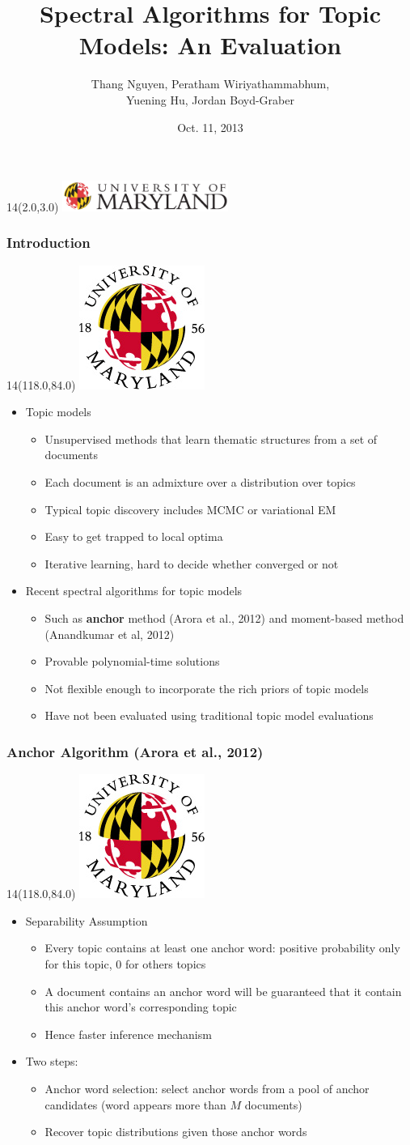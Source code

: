 \documentclass{beamer}
\title[Spectral Algorithms for Topic Models]{Spectral Algorithms for Topic Models: An Evaluation}
\author[Thang Nguyen et al.] {Thang Nguyen, Peratham Wiriyathammabhum, \\ Yuening Hu, Jordan Boyd-Graber}
\institute[UMD]{

   {daithang,peratham,ynhu,jbg}@umiacs.umd.edu\\
   University of Maryland, College Park
}
\date{Oct. 11, 2013}
\let\oldframetitle\frametitle
\renewcommand{\frametitle}[1]{
\oldframetitle{#1}
\BottomLogo
}
\let\oldtitlepage\titlepage
\renewcommand{\titlepage}{
\oldtitlepage
\TitleLogo
}
\newcommand{\BottomLogo}{
\begin{textblock}{14}(118.0,84.0)
\includegraphics[height=.8cm]{figures/umd-logo1.jpg}
\end{textblock}
}
\newcommand{\TitleLogo}{
\begin{textblock}{14}(2.0,3.0)
\includegraphics[height=1.0cm]{figures/umd-logo2.jpg}
\end{textblock}
}
\begin{document}
\begin{frame}
  \titlepage
\end{frame}

\begin{frame}
\frametitle{Introduction}

\begin{itemize}
\item Topic models
\begin{itemize}
\item Unsupervised methods that learn thematic structures from a set of documents
\item Each document is an admixture over a distribution over topics
\item Typical topic discovery includes MCMC or variational EM
\item Easy to get trapped to local optima
\item Iterative learning, hard to decide whether converged or not
\end{itemize}

\item Recent spectral algorithms for topic models
\begin{itemize}
\item Such as {\bf anchor} method (Arora et al., 2012) and moment-based method (Anandkumar et al, 2012)
\item Provable polynomial-time solutions
\item Not flexible enough to incorporate the rich priors of topic models
\item Have not been evaluated using traditional topic model evaluations
\end{itemize}
\end{itemize}
\end{frame}


\begin{frame}
\frametitle{Anchor Algorithm (Arora et al., 2012)}
\begin{itemize}
\item Separability Assumption
\begin{itemize}
\item Every topic contains at least one anchor word: positive probability only for this topic, 0 for others topics
\item A document contains an anchor word will be guaranteed that it contain this anchor word's corresponding topic
\item Hence faster inference mechanism
\end{itemize}
\item Two steps:
\begin{itemize}
\item Anchor word selection: select anchor words from a pool of anchor candidates (word appears more than $M$ documents)
\item Recover topic distributions given those anchor words
\end{itemize}
\end{itemize} 
\end{frame}
\end{document}
